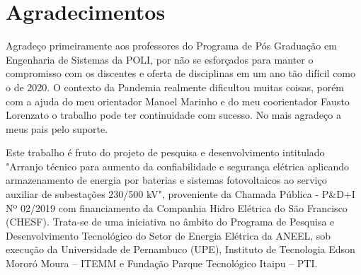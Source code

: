 \chapter*{Agradecimentos}

Agradeço primeiramente aos professores do Programa de Pós Graduação em Engenharia de Sistemas da POLI, por não se esforçados para manter o compromisso com os discentes e oferta de disciplinas em um ano tão difícil como o de 2020. O contexto da Pandemia realmente dificultou muitas coisas, porém com a ajuda do meu orientador Manoel Marinho e do meu coorientador Fausto Lorenzato o trabalho pode ter continuidade com sucesso. No mais agradeço a meus pais pelo suporte.

Este trabalho é fruto do projeto de pesquisa e desenvolvimento intitulado "Arranjo técnico para aumento da confiabilidade e segurança elétrica aplicando armazenamento de energia por baterias e sistemas fotovoltaicos ao serviço auxiliar de subestações 230/500 kV", proveniente da Chamada Pública - P&D+I Nº 02/2019 com financiamento da Companhia Hidro Elétrica do São Francisco (CHESF). Trata-se de uma iniciativa no âmbito do Programa de Pesquisa e Desenvolvimento Tecnológico do Setor de Energia Elétrica da ANEEL, sob execução da Universidade de Pernambuco (UPE), Instituto de Tecnologia Edson Mororó Moura – ITEMM e Fundação Parque Tecnológico Itaipu – PTI.
